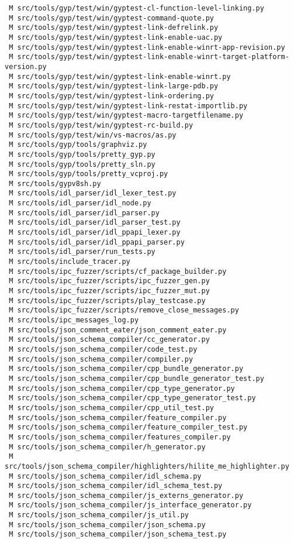 \documentclass{article}
\begin{document}
\begin{verbatim}
 M src/tools/gyp/test/win/gyptest-cl-function-level-linking.py
 M src/tools/gyp/test/win/gyptest-command-quote.py
 M src/tools/gyp/test/win/gyptest-link-defrelink.py
 M src/tools/gyp/test/win/gyptest-link-enable-uac.py
 M src/tools/gyp/test/win/gyptest-link-enable-winrt-app-revision.py
 M src/tools/gyp/test/win/gyptest-link-enable-winrt-target-platform-version.py
 M src/tools/gyp/test/win/gyptest-link-enable-winrt.py
 M src/tools/gyp/test/win/gyptest-link-large-pdb.py
 M src/tools/gyp/test/win/gyptest-link-ordering.py
 M src/tools/gyp/test/win/gyptest-link-restat-importlib.py
 M src/tools/gyp/test/win/gyptest-macro-targetfilename.py
 M src/tools/gyp/test/win/gyptest-rc-build.py
 M src/tools/gyp/test/win/vs-macros/as.py
 M src/tools/gyp/tools/graphviz.py
 M src/tools/gyp/tools/pretty_gyp.py
 M src/tools/gyp/tools/pretty_sln.py
 M src/tools/gyp/tools/pretty_vcproj.py
 M src/tools/gypv8sh.py
 M src/tools/idl_parser/idl_lexer_test.py
 M src/tools/idl_parser/idl_node.py
 M src/tools/idl_parser/idl_parser.py
 M src/tools/idl_parser/idl_parser_test.py
 M src/tools/idl_parser/idl_ppapi_lexer.py
 M src/tools/idl_parser/idl_ppapi_parser.py
 M src/tools/idl_parser/run_tests.py
 M src/tools/include_tracer.py
 M src/tools/ipc_fuzzer/scripts/cf_package_builder.py
 M src/tools/ipc_fuzzer/scripts/ipc_fuzzer_gen.py
 M src/tools/ipc_fuzzer/scripts/ipc_fuzzer_mut.py
 M src/tools/ipc_fuzzer/scripts/play_testcase.py
 M src/tools/ipc_fuzzer/scripts/remove_close_messages.py
 M src/tools/ipc_messages_log.py
 M src/tools/json_comment_eater/json_comment_eater.py
 M src/tools/json_schema_compiler/cc_generator.py
 M src/tools/json_schema_compiler/code_test.py
 M src/tools/json_schema_compiler/compiler.py
 M src/tools/json_schema_compiler/cpp_bundle_generator.py
 M src/tools/json_schema_compiler/cpp_bundle_generator_test.py
 M src/tools/json_schema_compiler/cpp_type_generator.py
 M src/tools/json_schema_compiler/cpp_type_generator_test.py
 M src/tools/json_schema_compiler/cpp_util_test.py
 M src/tools/json_schema_compiler/feature_compiler.py
 M src/tools/json_schema_compiler/feature_compiler_test.py
 M src/tools/json_schema_compiler/features_compiler.py
 M src/tools/json_schema_compiler/h_generator.py
 M src/tools/json_schema_compiler/highlighters/hilite_me_highlighter.py
 M src/tools/json_schema_compiler/idl_schema.py
 M src/tools/json_schema_compiler/idl_schema_test.py
 M src/tools/json_schema_compiler/js_externs_generator.py
 M src/tools/json_schema_compiler/js_interface_generator.py
 M src/tools/json_schema_compiler/js_util.py
 M src/tools/json_schema_compiler/json_schema.py
 M src/tools/json_schema_compiler/json_schema_test.py

\end{verbatim}
\end{document}
